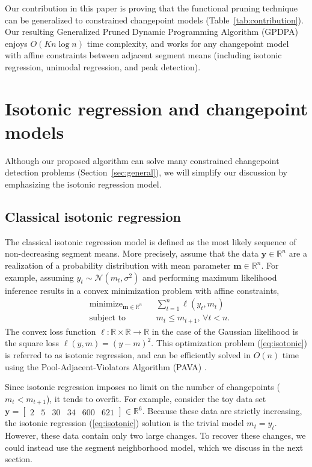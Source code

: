 \documentclass{article}
\DeclareMathOperator*{\minimize}{minimize}
\newcommand{\RR}{\mathbb R}
\begin{document}
Our contribution in this paper is proving that the functional pruning
technique can be generalized to constrained changepoint models
(Table~\ref{tab:contribution}). Our resulting Generalized Pruned
Dynamic Programming Algorithm (GPDPA) enjoys $O(Kn\log n)$ time
complexity, and works for any changepoint model with affine
constraints between adjacent segment means (including isotonic
regression, unimodal regression, and peak detection).



\section{Isotonic regression and changepoint models}
\label{sec:models}

Although our proposed algorithm can solve many constrained changepoint
detection problems (Section~\ref{sec:general}), we will simplify our
discussion by emphasizing the isotonic regression model. 

\subsection{Classical isotonic regression}

The classical isotonic regression model is defined as the most likely
sequence of non-decreasing segment means. More
precisely, assume that the data $\mathbf y\in\RR^n$ are a realization
of a probability distribution with mean parameter $\mathbf m\in\RR^n$. For
example, assuming $y_t \sim \mathcal N(m_t, \sigma^2)$ and performing
maximum likelihood inference results in a convex minimization problem
with affine constraints,
\begin{align}
  \label{eq:isotonic}
  &\minimize_{\mathbf m\in\RR^n} && 
  \sum_{t=1}^n \ell(y_t, m_t)\\
  &\text{subject to} && m_t \leq m_{t+1},\, \forall t<n.
  \nonumber
\end{align}
The convex loss function $\ell:\RR\times \RR\rightarrow\RR$ in the
case of the Gaussian likelihood is the square loss
$\ell(y, m) = (y-m)^2$. This optimization problem (\ref{eq:isotonic})
is referred to as isotonic regression, and can be efficiently solved
in $O(n)$ time using the Pool-Adjacent-Violators Algorithm (PAVA)
\citep{isotonic-unifying}.

Since isotonic regression imposes no limit on the number of
changepoints ($m_t < m_{t+1}$), it tends to overfit. For example,
consider the toy data set $\mathbf y= \left[
\begin{array}{cccccc}
  2 & 5 & 30 & 34 & 600 & 621
\end{array}
\right] \in\RR^6$. Because these data are strictly increasing, the
isotonic regression (\ref{eq:isotonic}) solution is the trivial model
$m_t=y_t$. However, these data contain only two large changes. To
recover these changes, we could instead use the segment neighborhood
model, which we discuss in the next section.
\end{document}
